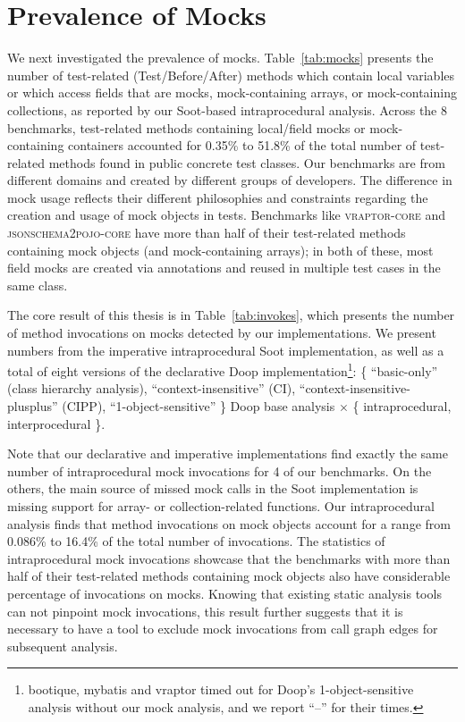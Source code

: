 \section{Prevalence of Mocks}

We next investigated the prevalence of mocks. Table~\ref{tab:mocks} presents the number of test-related (Test/Before/After) methods which contain local variables or which access fields that are mocks, mock-containing arrays, or mock-containing collections, as reported by our Soot-based intraprocedural analysis. Across the 8 benchmarks, test-related methods containing local/field mocks or mock-containing containers accounted for 0.35\% to 51.8\% of the total number of test-related methods found in public concrete test classes. Our benchmarks are from different domains and created by different groups of developers. The difference in mock usage reflects their different philosophies and constraints regarding the creation and usage of mock objects in tests. Benchmarks like \textsc{vraptor-core} and \textsc{jsonschema2pojo-core} have more than half of their test-related methods containing mock objects (and mock-containing arrays); in both of these, most field mocks are created via annotations and reused in multiple test cases in the same class.

The core result of this thesis is in Table~\ref{tab:invokes}, which presents the number of method invocations on mocks detected by our implementations. We present numbers from the imperative intraprocedural Soot implementation, as well as a total of eight versions of the declarative Doop implementation\footnote{bootique, mybatis and vraptor timed out for Doop's 1-object-sensitive analysis without our mock analysis, and we report ``--'' for their times.}: \{ ``basic-only'' (class hierarchy analysis), ``context-insensitive'' (CI), ``context-insensitive-plusplus'' (CIPP), ``1-object-sensitive'' \} Doop base analysis $\times$ \{ intraprocedural, interprocedural \}. 

Note that our declarative and imperative implementations find exactly the same number of intraprocedural mock invocations for 4 of our benchmarks. On the others, the main source of missed mock calls in the Soot implementation is missing support for array- or collection-related functions. Our intraprocedural analysis finds that method invocations on mock objects account for a range from 0.086\% to 16.4\% of the total number of invocations. The statistics of intraprocedural mock invocations showcase that the benchmarks with more than half of their test-related methods containing mock objects also have considerable percentage of invocations on mocks. Knowing that existing static analysis tools can not pinpoint mock invocations, this result further suggests that it is necessary to have a tool to exclude mock invocations from call graph edges for subsequent analysis. 

